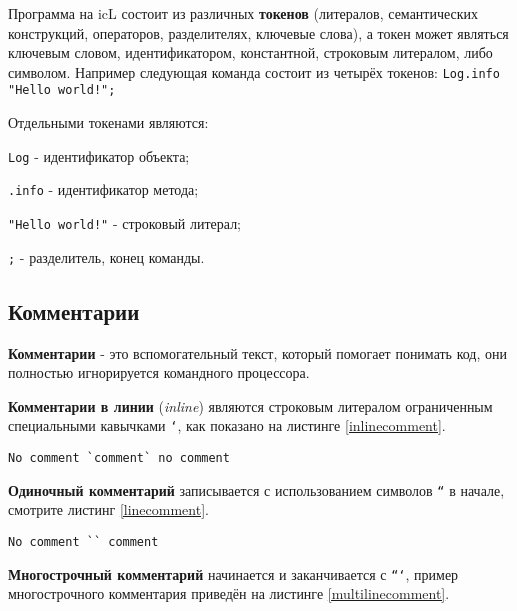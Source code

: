 Программа на icL состоит из различных \textbf{токенов} (литералов, семантических конструкций, операторов, разделителях, ключевые слова), а токен может являться ключевым словом, идентификатором, константной, строковым литералом, либо символом. Например следующая команда состоит из четырёх токенов: \texttt{Log.info "Hello world!";}

Отдельными токенами являются:

\begin{icItems}
\item
	\texttt{Log} - идентификатор объекта;
\item
	\texttt{.info} - идентификатор метода;
\item
	\texttt{"Hello world!"} - строковый литерал;
\item
	\texttt{;} - разделитель, конец команды.
\end{icItems}

\subsection{Комментарии}

\textbf{Комментарии} - это вспомогательный текст, который помогает понимать код, они полностью игнорируется командного процессора.

\textbf{Комментарии в линии} (\textit{inline}) являются строковым литералом ограниченным специальными кавычками \texttt{`}, как показано на листинге \ref{inlinecomment}.

\begin{sourcecode}
\label{inlinecomment}
\begin{verbatim}
No comment `comment` no comment
\end{verbatim}
\end{sourcecode}

\textbf{Одиночный комментарий} записывается с использованием символов \texttt{``} в начале, смотрите листинг \ref{linecomment}.

\begin{sourcecode}
\label{linecomment}
\begin{verbatim}
No comment `` comment
\end{verbatim}
\end{sourcecode}

\textbf{Многострочный комментарий} начинается и заканчивается с \texttt{```}, пример многострочного комментария приведён на листинге \ref{multilinecomment}.

